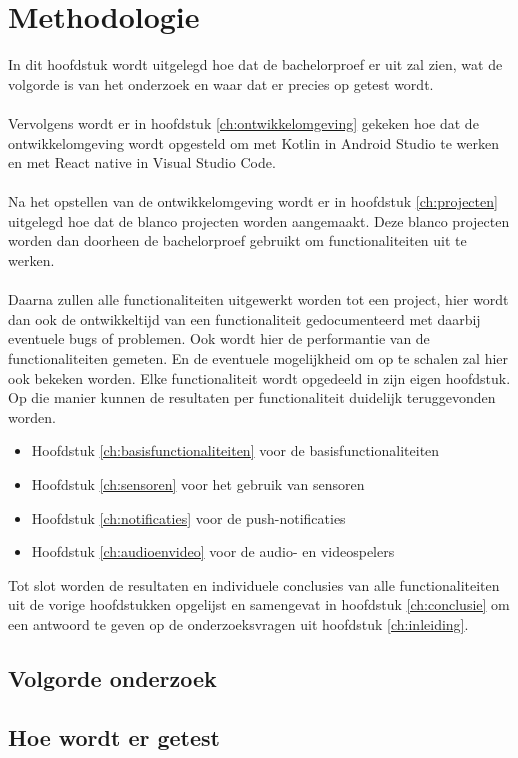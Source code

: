 
\chapter{Methodologie}
\label{ch:methodologie}

In dit hoofdstuk wordt uitgelegd hoe dat de bachelorproef er uit zal zien, wat 
de volgorde is van het onderzoek en waar dat er precies op getest wordt.
\\\\
Vervolgens wordt er in hoofdstuk \ref{ch:ontwikkelomgeving} gekeken hoe 
dat de ontwikkelomgeving wordt opgesteld om met Kotlin in Android Studio 
te werken en met React native in Visual Studio Code.
\\\\
Na het opstellen van de ontwikkelomgeving wordt er in hoofdstuk 
\ref{ch:projecten} uitgelegd hoe dat de blanco projecten worden aangemaakt. 
Deze blanco projecten worden dan doorheen de bachelorproef gebruikt om 
functionaliteiten uit te werken.
\\\\
Daarna zullen alle functionaliteiten uitgewerkt worden tot een project, 
hier wordt dan ook de ontwikkeltijd van een functionaliteit gedocumenteerd 
met daarbij eventuele bugs of problemen. Ook wordt hier de performantie van 
de functionaliteiten gemeten. En de eventuele mogelijkheid om op te 
schalen zal hier ook bekeken worden. Elke functionaliteit wordt opgedeeld 
in zijn eigen hoofdstuk. Op die manier kunnen de resultaten per 
functionaliteit duidelijk teruggevonden worden.
\begin{itemize}
    \item Hoofdstuk \ref{ch:basisfunctionaliteiten} voor de basisfunctionaliteiten
    \item Hoofdstuk \ref{ch:sensoren} voor het gebruik van sensoren
    \item Hoofdstuk \ref{ch:notificaties} voor de push-notificaties
    \item Hoofdstuk \ref{ch:audioenvideo} voor de audio- en videospelers
\end{itemize}
Tot slot worden de resultaten en individuele conclusies van alle 
functionaliteiten uit de vorige hoofdstukken opgelijst en samengevat in hoofdstuk 
\ref{ch:conclusie} om een antwoord te geven op de onderzoeksvragen uit 
hoofdstuk \ref{ch:inleiding}.

\section{Volgorde onderzoek}



\section{Hoe wordt er getest}




